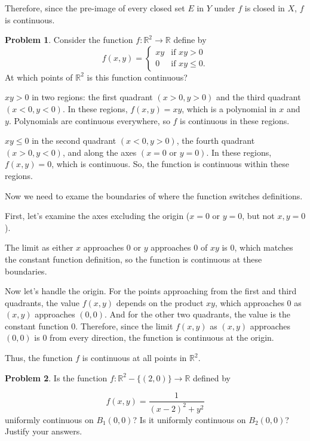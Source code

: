 \documentclass[12]{amsart}
\theoremstyle{definition}
\newtheorem{xca}{Problem}
\newcommand{\R}{\mathbb{R}}
\newcommand{\sskip}{\newpage}
\begin{document}
Therefore, since the pre-image of every closed set $E$ in $Y$ under $f$ is closed in $X$,
$f$ is continuous.

\sskip


\begin{xca}
Consider the function $f:\R^2\to\R$ define by
$$
f(x,y)=
\begin{cases}
xy &\text{if $xy>0$}\\
0 &\text{if $xy\leq 0$}.
\end{cases}
$$
At which points of $\R^2$ is this function continuous?
\end{xca}

$xy > 0$ in two regions: the first quadrant $(x > 0, y > 0)$
and the third quadrant $(x < 0, y < 0)$.
In these regions, $f(x, y) = xy$, which is a polynomial in $x$ and $y$.
Polynomials are continuous everywhere, so $f$ is continuous in these regions.

$xy \leq 0$ in the second quadrant $(x < 0, y > 0)$,
the fourth quadrant $(x > 0, y < 0)$, and along the axes $(x = 0 \text{ or } y = 0)$.
In these regions, $f(x, y) = 0$, which is continuous. So, the function is continuous
within these regions.

Now we need to exame the boundaries of where the function switches definitions.

First, let's examine the axes excluding the origin
($x = 0$ or $y = 0$, but not $x, y = 0$).

The limit as either $x$ approaches $0$ or $y$ approaches $0$ of $xy$
is $0$, which matches the constant function definition, so the function is continuous
at these boundaries.

Now let's handle the origin. For the points approaching from the first and
third quadrants, the value $f(x, y)$ depends on the product $xy$, which approaches
$0$ as $(x, y)$ approaches $(0, 0)$. And for the other two quadrants, the value
is the constant function $0$. Therefore, since the limit $f(x, y)$
as $(x, y)$ approaches $(0, 0)$ is $0$ from every direction, the function
is continuous at the origin.

Thus, the function $f$ is continuous at all points in $\R^2$.

\sskip


\begin{xca}
Is the function $f:\R^2-\{(2,0)\}\to \R$ defined by

$$
f(x,y)=\frac{1}{(x-2)^2+y^2}
$$
uniformly continuous on $B_1(0,0)$? Is it uniformly continuous on $B_2(0,0)$? Justify your answers.
\end{xca}
\end{document}
